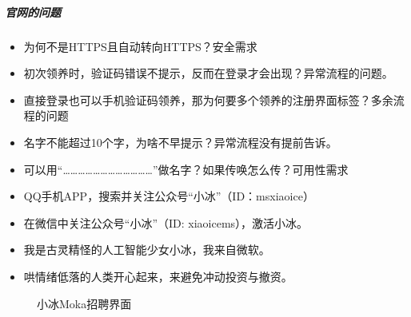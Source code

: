 \documentclass[letterpaper,10pt,english]{sphinxmanual}
\begin{document}
\subparagraph{官网的问题}
\label{\detokenize{chapter_interview/simulate_interview:id11}}
\begin{itemize}
\item {} 
为何不是HTTPS且自动转向HTTPS？安全需求

\item {} 
初次领养时，验证码错误不提示，反而在登录才会出现？异常流程的问题。

\item {} 
直接登录也可以手机验证码领养，那为何要多个领养的注册界面标签？多余流程的问题

\item {} 
名字不能超过10个字，为啥不早提示？异常流程没有提前告诉。

\item {} 
可以用“………………………………”做名字？如果传唤怎么传？可用性需求

\item {} 
QQ手机APP，搜索并关注公众号“小冰”（ID：ms\sphinxhyphen{}xiaoice）

\item {} 
在微信中关注公众号“小冰”（ID: xiaoice\sphinxhyphen{}ms），激活小冰。

\item {} 
我是古灵精怪的人工智能少女小冰，我来自微软。%
\begin{footnote}[880]\sphinxAtStartFootnote
{}
%
\end{footnote}

\item {} 
哄情绪低落的人类开心起来，来避免冲动投资与撤资。%
\begin{footnote}[881]\sphinxAtStartFootnote
{}
%
\end{footnote}

\end{itemize}

\begin{figure}[H]
\centering
\capstart

\noindent{}
\caption{小冰Moka招聘界面\sphinxfootnotemark[882]}\label{\detokenize{chapter_interview/simulate_interview:id16}}\end{figure}
%
\begin{footnotetext}[882]\sphinxAtStartFootnote
{}
%
\end{footnotetext}\ignorespaces 
\end{document}

